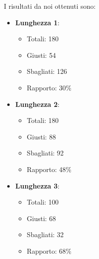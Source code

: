 \documentclass[a4paper, 12pt]{article}
\begin{document}
I risultati da noi ottenuti sono:
\begin{itemize}
\item \textbf{Lunghezza 1}:
\begin{itemize}
\item Totali: 180
\item Giusti: 54
\item Sbagliati: 126	
\item Rapporto: 30\%
\end{itemize}
\item \textbf{Lunghezza 2}:
\begin{itemize}
\item Totali: 180
\item Giusti: 88
\item Sbagliati: 92
\item Rapporto: 48\%
\end{itemize}
\item \textbf{Lunghezza 3}:
\begin{itemize}
\item Totali: 100
\item Giusti: 68
\item Sbagliati: 32
\item Rapporto: 68\%
\end{itemize}

\newpage


\end{itemize}
\end{document}
